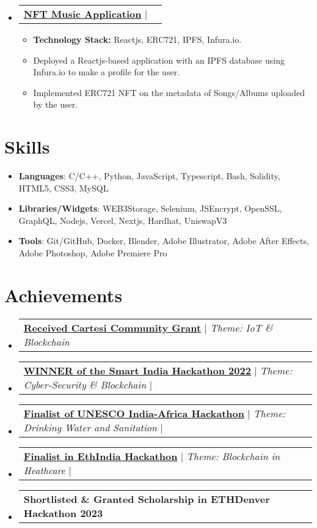 \documentclass[a4paper]{article}
\makeatletter
\newcommand{\resumeItem}[2]{
  \item\small{
    \textbf{#1}{: #2 \vspace{-2pt}}
  }
}
\newcommand{\resumeItemWithoutTitle}[1]{
  \item\small{
    {#1 \vspace{-2pt}}
      {\vspace{-2pt}}
  }
}
\newcommand{\resumeSubheadingPro}[2]{
  \vspace{-1pt}\item
  \begin{tabular*}{0.97\textwidth}{l@{\extracolsep{\fill}}r}
    #1 & {\textit {\small{#2}}} \\
  \end{tabular*}\vspace{-5pt}
}
\newcommand{\resumeSubItem}[2]{\resumeItem{#1}{#2}\vspace{-4pt}}
\newcommand{\resumeSubHeadingListStart}{\begin{itemize}[leftmargin=*,
      label={}]}
\newcommand{\resumeSubHeadingListEnd}{\end{itemize}}
\newcommand{\resumeItemListStart}{\begin{itemize}}
\newcommand{\resumeItemListEnd}{\end{itemize}\vspace{-5pt}}
\makeatother
\begin{document}
\resumeSubHeadingListStart
\resumeSubheadingPro
{\href{https://github.com/Aryamanraj/musicNFTReactApp}{{\textbf{NFT Music
          Application}}} $|$
  \href{https://github.com/Aryamanraj/musicNFTReactApp/}{\faIcon{github}}}{}
\resumeItemListStart
\resumeItemWithoutTitle
{\textbf{Technology Stack:} Reactjs, ERC721, IPFS, Infura.io.}
\resumeItemWithoutTitle
{Deployed a Reactjs-based application with an IPFS database using Infura.io to
  make a profile for the user.}
\resumeItemWithoutTitle
{Implemented ERC721 NFT on the metadata of Songs/Albums uploaded by the user.}
\resumeItemListEnd
\resumeSubHeadingListEnd

%
\section{Skills}
\resumeSubHeadingListStart
\resumeSubItem{Languages}{C/C++, Python, JavaScript, Typescript, Bash,
  Solidity, HTML5, CSS3, MySQL}
\resumeSubItem{Libraries/Widgets}{WEB3Storage, Selenium, JSEncrypt, OpenSSL,
  GraphQL, Nodejs, Vercel, Nextjs, Hardhat, UniswapV3}
\resumeSubItem{Tools}{Git/GitHub, Docker, Blender, Adobe Illustrator, Adobe
  After Effects, Adobe Photoshop, Adobe Premiere Pro}
\resumeSubHeadingListEnd

\section{Achievements}
\resumeSubHeadingListStart
\resumeSubheadingPro
{\href{}{{\textbf{Received Cartesi Community Grant}}}	  $|$ \emph{Theme: IoT
    \& Blockchain}}{}
\resumeSubheadingPro
{\href{https://github.com/Aryamanraj/enigma/}{{\textbf{WINNER of the Smart
          India Hackathon 2022}}}     $|$ \emph{Theme: Cyber-Security \& Blockchain} $|$
  \href{https://github.com/Aryamanraj/enigma/}{\faIcon{github}}}{}
\resumeSubheadingPro
{ \href{https://github.com/Aryamanraj/uia}{{\textbf{Finalist of UNESCO
          India-Africa Hackathon}}} $|$ \emph{Theme: Drinking Water and Sanitation} $|$
  \href{https://github.com/Aryamanraj/uia}{\faIcon{github}}}{}
\resumeSubheadingPro
{ \href{https://github.com/Aryamanraj/ethindiaApi}{\textbf{Finalist in EthIndia
      Hackathon}} $|$  \emph{Theme: Blockchain in Heathcare} $|$
  \href{https://github.com/Aryamanraj/ethindiaApi}{{\faIcon{github}}}}{}
\resumeSubheadingPro
{{\textbf{Shortlisted \& Granted Scholarship in ETHDenver Hackathon 2023}}
  \emph{} {\underline{\textbf{}}}}{}
\resumeSubHeadingListEnd
\end{document}
